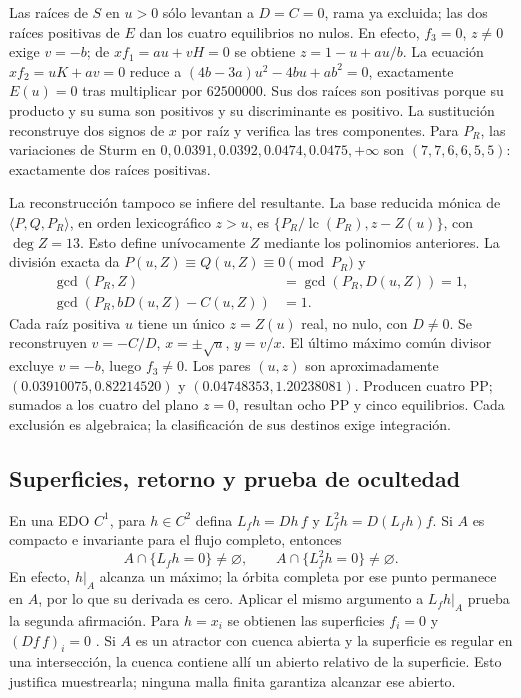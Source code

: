 Las raíces de $S$
en $u>0$ sólo levantan a $D=C=0$, rama ya excluida; las dos raíces
positivas de $E$ dan los cuatro equilibrios no nulos. En efecto,
$f_3=0$, $z\ne0$ exige $v=-b$; de $xf_1=au+vH=0$ se obtiene
$z=1-u+au/b$. La ecuación $xf_2=uK+av=0$ reduce a
$(4b-3a)u^2-4bu+ab^2=0$, exactamente $E(u)=0$ tras multiplicar
por $62500000$. Sus dos raíces son positivas porque su producto y su
suma son positivos y su discriminante es positivo. La sustitución
reconstruye dos signos de $x$ por raíz y verifica las tres componentes.
Para $P_R$, las variaciones de Sturm en
$0,0.0391,0.0392,0.0474,0.0475,+\infty$ son $(7,7,6,6,5,5)$:
exactamente dos raíces positivas.

La reconstrucción tampoco se infiere del resultante. La base reducida
mónica de $\langle P,Q,P_R\rangle$, en orden lexicográfico $z>u$, es
$\{P_R/\operatorname{lc}(P_R),z-Z(u)\}$, con $\deg Z=13$.
Esto define unívocamente $Z$ mediante los polinomios anteriores. La
división exacta da $P(u,Z)\equiv Q(u,Z)\equiv0\pmod{P_R}$ y
\begin{equation}
 \begin{aligned}
 \gcd(P_R,Z)&=\gcd(P_R,D(u,Z))=1,\\
 \gcd(P_R,bD(u,Z)-C(u,Z))&=1.
 \end{aligned}
 \label{bre:geo:rf-lift}
\end{equation}
Cada raíz positiva $u$ tiene un único $z=Z(u)$ real, no nulo, con
$D\ne0$. Se reconstruyen $v=-C/D$, $x=\pm\sqrt u$, $y=v/x$.
El último máximo común divisor excluye $v=-b$, luego $f_3\ne0$.
Los pares $(u,z)$ son aproximadamente $(0.03910075,0.82214520)$ y
$(0.04748353,1.20238081)$. Producen cuatro PP; sumados a los cuatro
del plano $z=0$, resultan ocho PP y cinco equilibrios. Cada exclusión
es algebraica; la clasificación de sus destinos exige integración.

\subsection{Superficies, retorno y prueba de ocultedad}

En una EDO $C^1$, para $h\in C^2$ defina
$L_fh=Dh\,f$ y $L_f^2h=D(L_fh)f$. Si $A$ es compacto e invariante
para el flujo completo, entonces
\begin{equation}
 A\cap\{L_fh=0\}\ne\varnothing,\qquad
 A\cap\{L_f^2h=0\}\ne\varnothing.
 \label{bre:geo:coverage}
\end{equation}
En efecto, $h|_A$ alcanza un máximo; la órbita completa por ese punto
permanece en $A$, por lo que su derivada es cero. Aplicar el mismo
argumento a $L_fh|_A$ prueba la segunda afirmación. Para $h=x_i$ se
obtienen las superficies $f_i=0$ y $(Df\,f)_i=0$
\cite{GodaraEtAl2018CriticalSurfaces}. Si $A$ es un atractor con cuenca
abierta y la superficie es regular en una intersección, la cuenca
contiene allí un abierto relativo de la superficie. Esto justifica
muestrearla; ninguna malla finita garantiza alcanzar ese abierto.

